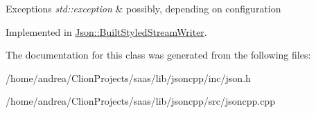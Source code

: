 \begin{DoxyExceptions}{Exceptions}
{\em std\+::exception} & possibly, depending on configuration \\
\hline
\end{DoxyExceptions}


Implemented in \hyperlink{struct_json_1_1_built_styled_stream_writer_a2ecffc3d66c4feddf208e5cd3b1c0f18}{Json\+::\+Built\+Styled\+Stream\+Writer}.



The documentation for this class was generated from the following files\+:\begin{DoxyCompactItemize}
\item 
/home/andrea/\+Clion\+Projects/saas/lib/jsoncpp/inc/json.\+h\item 
/home/andrea/\+Clion\+Projects/saas/lib/jsoncpp/src/jsoncpp.\+cpp\end{DoxyCompactItemize}
